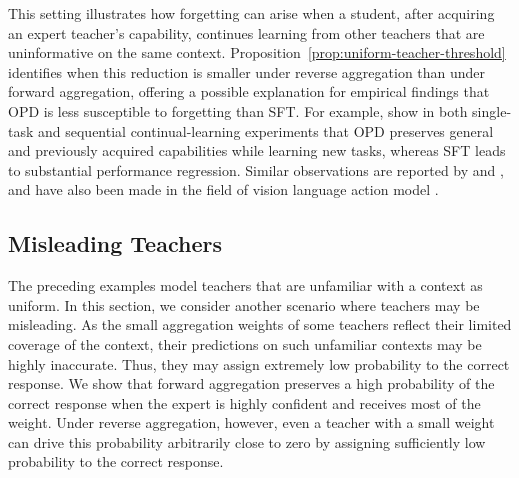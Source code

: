 \documentclass[11pt]{article}
\begin{document}
\begin{remark}
This setting illustrates how forgetting can arise when a student, after acquiring an expert teacher's capability, continues learning from other teachers that are uninformative on the same context. Proposition~\ref{prop:uniform-teacher-threshold} identifies when this reduction is smaller under reverse aggregation than under forward aggregation, offering a possible explanation for empirical findings that OPD is less susceptible to forgetting than SFT. For example, \citet{shenfeld2026self} show in both single-task and sequential continual-learning experiments that OPD preserves general and previously acquired capabilities while learning new tasks, whereas SFT leads to substantial performance regression. Similar observations are reported by \citet{hubotter2026reinforcement} and \citet{ma2026one}, and have also been made in the field of vision language action model \citep{zhong2026vla}.
\end{remark}
\subsection{Misleading Teachers}
The preceding examples model teachers that are unfamiliar with a context as uniform. In this section, we consider another scenario where teachers may be misleading. As the small aggregation weights of some teachers reflect their limited coverage of the context, their predictions on such unfamiliar contexts may be highly inaccurate. Thus, they may assign extremely low probability to the correct response. We show that forward aggregation preserves a high probability of the correct response when the expert is highly confident and receives most of the weight. Under reverse aggregation, however, even a teacher with a small weight can drive this probability arbitrarily close to zero by assigning sufficiently low probability to the correct response.
\end{document}
